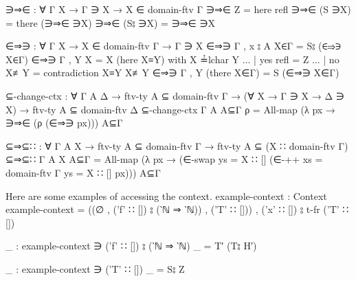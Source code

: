 \documentclass[logo,bsc,singlespacing,parskip,online]{infthesis}
\renewenvironment{code}{\mintedcopy[breaklines,breaksymbolleft=\;]{agda}}{\endmintedcopy}
\begin{document}
\begin{code}
  ∋⇒∈ : ∀ {Γ X} → Γ ∋ X → X ∈ domain-ftv Γ
  ∋⇒∈ Z = here refl
  ∋⇒∈ (S ∋X) = there (∋⇒∈ ∋X)
  ∋⇒∈ (S⦂ ∋X) = ∋⇒∈ ∋X

  ∈⇒∋ : ∀ {Γ X} → X ∈ domain-ftv Γ → Γ ∋ X
  ∈⇒∋ {Γ , x ⦂ A} X∈Γ = S⦂ (∈⇒∋ X∈Γ)
  ∈⇒∋ {Γ , Y} {X = X} (here X≡Y) with X ≟lchar Y
  ... | yes refl = Z
  ... | no  X≢Y  = contradiction X≡Y X≢Y
  ∈⇒∋ {Γ , Y} (there X∈Γ) = S (∈⇒∋ X∈Γ)

  ⊆-change-ctx : ∀ {Γ A Δ}
    → ftv-ty A ⊆ domain-ftv Γ
    → (∀ {X} → Γ ∋ X → Δ ∋ X)
    → ftv-ty A ⊆ domain-ftv Δ
  ⊆-change-ctx {Γ} {A} A⊆Γ ρ = All-map (λ px → ∋⇒∈ (ρ (∈⇒∋ px))) A⊆Γ

  ⊆⇒⊆∷ : ∀ {Γ A X}
    → ftv-ty A ⊆ domain-ftv Γ
    → ftv-ty A ⊆ (X ∷ domain-ftv Γ)
  ⊆⇒⊆∷ {Γ} {A} {X} A⊆Γ = All-map (λ px → (∈-swap {ys = X ∷ []} (∈-++ {xs = domain-ftv Γ} {ys = X ∷ []} px))) A⊆Γ
\end{code}

Here are some examples of accessing the context.
\begin{code}
  example-context : Context
  example-context = ((∅ , ('f' ∷ []) ⦂ (‵ℕ ⇒ ‵ℕ)) , ('T' ∷ [])) , ('x' ∷ []) ⦂ t-fr ('T' ∷ [])

  _ : example-context ∋ ('f' ∷ []) ⦂ (‵ℕ ⇒ ‵ℕ)
  _ = T′ (T⦂ H′)

  _ : example-context ∋ ('T' ∷ [])
  _ = S⦂ Z
\end{code}

\begin{code}
\end{code}
\end{document}
